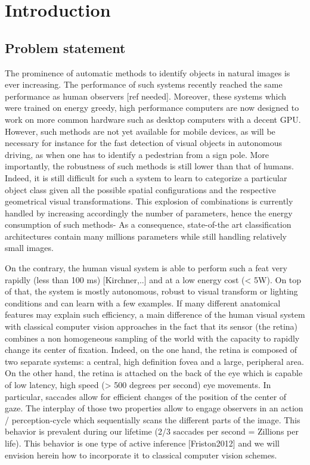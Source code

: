\section{Introduction}

\subsection{Problem statement}

The prominence of automatic methods to identify objects in natural images is ever increasing. The performance of such systems recently reached the same performance as human observers [ref needed]. Moreover, these systems which were trained on energy greedy, high performance computers are now designed to work on more common hardware such as desktop computers with a decent GPU. However, such methods are not yet available for mobile devices, as will be necessary for instance for the fast detection of visual objects in autonomous driving, as when one has to identify a pedestrian from a sign pole. More importantly, the robustness of such methods is still lower than that of humans. Indeed, it is still difficult for such a system to learn to categorize a particular object class given all the possible spatial configurations and the respective geometrical visual transformations. This explosion of combinations is currently handled by increasing accordingly the number of parameters, hence the energy consumption of such methods- As a consequence, state-of-the art classification architectures contain many millions parameters while still handling relatively small images.

On the contrary, the human visual system is able to perform such a feat very rapidly (less than 100 ms) [Kirchner,..] and at a low energy cost (< 5W). On top of that, the system is mostly autonomous, robust to visual transform or lighting conditions and can learn with a few examples. If many different anatomical features may explain such efficiency, a main difference of the human visual system with classical computer vision approaches in the fact that its sensor (the retina) combines a non homogeneous sampling of the world with the capacity to rapidly change its center of fixation. Indeed, on the one hand, the retina is composed of two separate systems: a central, high definition fovea and a large, peripheral area. On the other hand, the retina is attached on the back of the eye which is capable of low latency, high speed (> 500 degrees per second) eye movements. In particular, saccades allow for efficient changes of the position of the center of gaze. The interplay of those two properties allow to engage observers in an action / perception-cycle which sequentially scans the different parts of the image. This behavior is prevalent during our lifetime (2/3 saccades per second = Zillions per life). This behavior is one type of active inference [Friston2012] and we will envision herein how to incorporate it to classical computer vision schemes.

